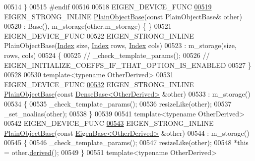\begin{DoxyCode}
00514     \}
00515 \textcolor{preprocessor}{#endif}
00516 
00518     EIGEN\_DEVICE\_FUNC
\hyperlink{class_eigen_1_1_plain_object_base_a69656a28768b9b6f8b283e251d3552be}{00519}     EIGEN\_STRONG\_INLINE \hyperlink{class_eigen_1_1_plain_object_base_a69656a28768b9b6f8b283e251d3552be}{PlainObjectBase}(\textcolor{keyword}{const} PlainObjectBase& other)
00520       : Base(), m\_storage(other.m\_storage) \{ \}
00521     EIGEN\_DEVICE\_FUNC
00522     EIGEN\_STRONG\_INLINE PlainObjectBase(\hyperlink{namespace_eigen_a62e77e0933482dafde8fe197d9a2cfde}{Index} size, \hyperlink{namespace_eigen_a62e77e0933482dafde8fe197d9a2cfde}{Index} rows, \hyperlink{namespace_eigen_a62e77e0933482dafde8fe197d9a2cfde}{Index} cols)
00523       : m\_storage(size, rows, cols)
00524     \{
00525 \textcolor{comment}{//       \_check\_template\_params();}
00526 \textcolor{comment}{//       EIGEN\_INITIALIZE\_COEFFS\_IF\_THAT\_OPTION\_IS\_ENABLED}
00527     \}
00528 
00530     \textcolor{keyword}{template}<\textcolor{keyword}{typename} OtherDerived>
00531     EIGEN\_DEVICE\_FUNC
\hyperlink{class_eigen_1_1_plain_object_base_a82cdb1b9d5c90c2002cb5086c03c29fa}{00532}     EIGEN\_STRONG\_INLINE \hyperlink{class_eigen_1_1_plain_object_base_a82cdb1b9d5c90c2002cb5086c03c29fa}{PlainObjectBase}(\textcolor{keyword}{const} 
      \hyperlink{group___core___module_class_eigen_1_1_dense_base}{DenseBase<OtherDerived>} &other)
00533       : m\_storage()
00534     \{
00535       \_check\_template\_params();
00536       resizeLike(other);
00537       \_set\_noalias(other);
00538     \}
00539 
00541     \textcolor{keyword}{template}<\textcolor{keyword}{typename} OtherDerived>
00542     EIGEN\_DEVICE\_FUNC
\hyperlink{class_eigen_1_1_plain_object_base_a31d65efdbeaf9c7693bf6ae204d788f2}{00543}     EIGEN\_STRONG\_INLINE \hyperlink{class_eigen_1_1_plain_object_base_a31d65efdbeaf9c7693bf6ae204d788f2}{PlainObjectBase}(\textcolor{keyword}{const} 
      \hyperlink{group___core___module_struct_eigen_1_1_eigen_base}{EigenBase<OtherDerived>} &other)
00544       : m\_storage()
00545     \{
00546       \_check\_template\_params();
00547       resizeLike(other);
00548       *\textcolor{keyword}{this} = other.\hyperlink{group___core___module_a324b16961a11d2ecfd2d1b7dd7946545}{derived}();
00549     \}
00551     \textcolor{keyword}{template}<\textcolor{keyword}{typename} OtherDerived>

\end{DoxyCode}

